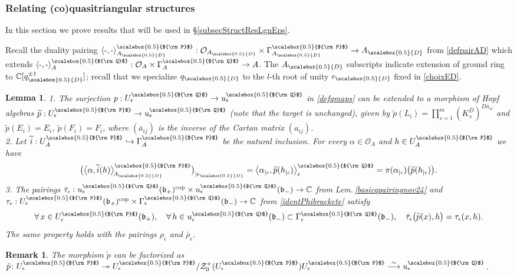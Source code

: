 \documentclass[11pt]{amsart}
\newtheorem{lem}[teo]{Lemma}
\newtheorem{remark}[teo]{Remark}
\newcommand{\e}{\epsilon}
\newcommand{\mc}{\mathbb{C}}
\newcommand{\Oo}{\mathcal{O}}
\newcommand{\qD}{q_{\scalebox{0.5}{D}}}
\newcommand{\eD}{\epsilon_{\scalebox{0.5}{D}}}
\newcommand{\AD}{A_{\scalebox{0.5}{D}}}
\newcommand{\Q}{{\scalebox{0.5}{${\rm Q}$}}}
\newcommand{\Pup}{{\scalebox{0.5}{${\rm P}$}}}
\begin{document}
\subsubsection{Relating (co)quasitriangular structures}\label{sectionlemmas} 

In this section we prove results that will be used in \S\ref{subsecStructResLgnEps}.

\smallskip

Recall the duality pairing $\langle \text{-}, \text{-} \rangle_{\AD}^\Pup : \Oo_{\AD} \times \Gamma_{\AD}^\Pup \to \AD$ from \eqref{defpairAD} which extends $\langle \text{-},\text{-} \rangle_A^\Q : \Oo_A \times \Gamma_A^\Q \to A$. The $\AD$ subscripts indicate extension of ground ring to $\mathbb{C}[\qD^{\pm 1}]$; recall that we specialize $\qD$ to the $l$-th root of unity $\eD$ fixed in \eqref{choixED}.
\begin{lem}\label{evalinnerprodA}
1. The surjection $p : U_\e^\Q \to u_\e^\Q$ in \eqref{defqmaps} can be extended to a morphism of Hopf algebras $\widetilde{p} : U_\e^\Pup \to u_\e^\Q$ (note that the target is unchanged), given by $\textstyle \widetilde{p}(L_i) = \prod_{s=1}^m (K_s^{\overline{D}})^{D\overline{a}_{si}}$ and $\textstyle \widetilde{p}(E_i)=E_i$, $\textstyle \widetilde{p}(F_i)=F_i$, where $(\overline{a}_{ij})$ is the inverse of the Cartan matrix $(a_{ij})$.
\\2. Let $\widetilde{i} : U_A^\Pup \hookrightarrow \Gamma_A^\Pup$ be the natural inclusion. For every $\alpha\in \Oo_A$ and $h\in U_A^\Pup$ we have
\[ \bigl( \bigl\langle \alpha,\widetilde{i}(h) \bigr\rangle_{\!\AD}^\Pup \bigr)_{\vert \eD} = \bigl\langle \alpha_{|\e}, \widetilde{p}(h_{|\e}) \bigr\rangle_\e^\Q = \pi(\alpha_{|\e})\bigl( \widetilde{p}(h_{|\e}) \bigr). \]
3. The pairings $\bar{\tau}_\e : u_\e^\Q(\mathfrak{b}_+)^{\rm cop} \times u_\e^\Q(\mathfrak{b}_-) \to \mathbb{C}$ from Lem.\,\ref{basicqpairingnov24} and $\tau_{\e} : U_\e^\Pup(\mathfrak{b}_+)^{\rm cop}\times \Gamma_\e^\Q(\mathfrak{b}_-)\to \mc$ from \eqref{identPhibrackete} satisfy
\[ \forall \, x \in U_\e^\Pup(\mathfrak{b}_+), \quad \forall \, h \in u_\e^\Q(\mathfrak{b}_-) \subset \Gamma_ \e^\Q(\mathfrak{b}_-), \quad \bar{\tau}_\e\bigl( \widetilde{p}(x),h \bigr) = \tau_{\e}(x,h). \]
The same property holds with the pairings $\rho_{\e}$ and $\bar{\rho}_\e$.
\end{lem}
\begin{remark}\label{tildepfactomars26}{\rm The morphism $\tilde{p}$ can be factorized as $\tilde{p}\colon U_\e^\Pup \twoheadrightarrow U_\e^\Pup/\mathcal{Z}_0^+(U_\e^\Pup)U_\e^\Pup \overset{\sim}{\longrightarrow} u_\e^\Q$. }
\end{remark}
\end{document}
